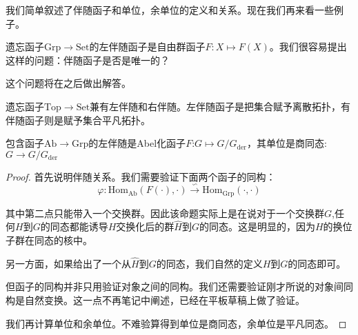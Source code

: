      我们简单叙述了伴随函子和单位，余单位的定义和关系。现在我们再来看一些例子。
     \begin{example}{}
        遗忘函子$\mathrm{Grp} \to \mathrm{Set}$的左伴随函子是自由群函子$F:X \mapsto F(X)$。我们很容易提出这样的问题：伴随函子是否是唯一的？

        这个问题将在之后做出解答。
     \end{example}
     \begin{example}{}
        遗忘函子$\mathrm{Top} \to \mathrm{Set}$兼有左伴随和右伴随。左伴随函子是把集合赋予离散拓扑，有伴随函子则是赋予集合平凡拓扑。
     \end{example}
     \begin{example}{}
        包含函子$\mathrm{Ab} \to \mathrm{Grp}$的左伴随是\rm{Abel}化函子$F$:$G \mapsto G/G_{\mathrm{der}}$，其单位是商同态:$G \to G/G_{\mathrm{der}}$
     \end{example}
     \begin{proof}
        首先说明伴随关系。我们需要验证下面两个函子的同构：
        $$
        \varphi:\mathrm{Hom}_{\mathrm{Ab}}(F(\cdot),\cdot) \overset{\backsim}{\to} \mathrm{Hom}_{\mathrm{Grp}}(\cdot,\cdot)
        $$
        
        其中第二点只能带入一个交换群。因此该命题实际上是在说对于一个交换群$G$,任何$H$到$G$的同态都能诱导$H$交换化后的群$\widehat{H}$到$G$的同态。这是明显的，因为$H$的换位子群在同态的核中。
        
        另一方面，如果给出了一个从$\widehat{H}$到$G$的同态，我们自然的定义$H$到$G$的同态即可。

        但函子的同构并非只用验证对象之间的同构。我们还需要验证刚才所说的对象间同构是自然变换。这一点不再笔记中阐述，已经在平板草稿上做了验证。

        我们再计算单位和余单位。不难验算得到单位是商同态，余单位是平凡同态。
     \end{proof}

